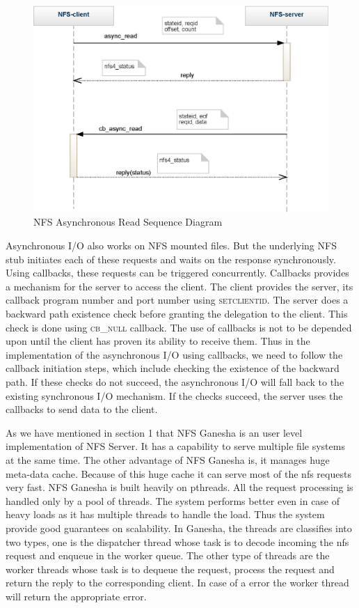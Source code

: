 \begin{figure}[htp]
\centering
\includegraphics[scale=0.75]{figures/sequence_asyncread.eps}
\caption{NFS Asynchronous Read Sequence Diagram}
\label{fig:NFSAsyncRead}
\end{figure}


Asynchronous I/O also works on NFS mounted files. But the underlying NFS stub initiates each of these requests and waits on the response synchronously. Using callbacks, these requests can be triggered concurrently. Callbacks provides a mechanism for the server to access the client. The client provides the server, its callback program number and port number using \textsc{setclientid}. The server does a backward path existence check before granting the delegation to the client. This check is done using \textsc{cb\_null} callback. The use of callbacks is not to be depended upon until the client has proven its ability to receive them. Thus in the implementation of the asynchronous I/O using callbacks, we need to follow the callback initiation steps, which include checking the existence of the backward path. If these checks do not succeed, the asynchronous I/O will fall back to the existing synchronous I/O mechanism. If the checks succeed, the server uses the callbacks to send data to the client.

   As we have mentioned in section 1 that NFS Ganesha is an user level implementation of NFS Server. It has a capability to serve multiple file systems at the same time. The other advantage of NFS Ganesha is, it manages huge meta-data cache. Because of this huge cache it can serve most of the nfs requests very fast. NFS Ganesha is built heavily on pthreads.
All the request processing is handled only by a pool of threads. The system performs better even in case of heavy loads as it has multiple threads to handle the load. Thus the system provide good guarantees on scalability. In Ganesha, the threads are classifies into two types, one is the dispatcher thread whose task is to decode incoming the nfs request and enqueue in the worker queue. The other type of threads are the worker threads whose task is to dequeue the request, process the request and return the reply to the corresponding client. In case of a error the worker thread will return the appropriate error.





